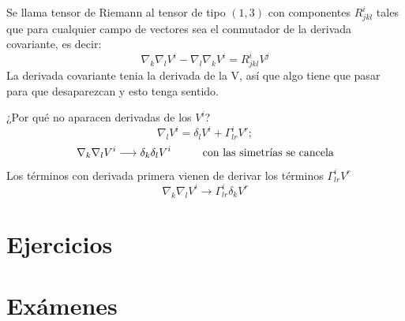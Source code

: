 \documentclass[palatino, bibnumbers]{apuntes}
\begin{document}
 \begin{defn} Se llama tensor de Riemann al tensor de tipo $(1,3)$ con componentes $R^i_{jkl}$ tales que para cualquier campo de vectores sea el conmutador de la derivada covariante, es decir: $$\nabla_k\nabla_lV^i-\nabla_l\nabla_kV^i=R^i_{jkl}V^j$$ La derivada covariante tenia la derivada de la V, así que algo tiene que pasar para que desaparezcan y esto tenga sentido.
 \end{defn}

\begin{obs}¿Por qué no aparacen derivadas de los $V^i$? $$\nabla_lV^i=\delta
	_lV^i+\Gamma^i_{lr}V^r;$$ $$\nabla_k\nabla_lV^i\longrightarrow\delta_k\delta_lV^i\hspace*{1cm}\text{con las simetrías se cancela}$$
	Los términos con derivada primera vienen de derivar los términos $\Gamma^i_{lr}V^r$ $$\nabla_k\nabla_lV^i\longrightarrow\Gamma^i_{lr}\delta_kV^r$$
	\end{obs}
\appendix

\chapter{Ejercicios}

\chapter{Exámenes}


\printindex
\end{document}
